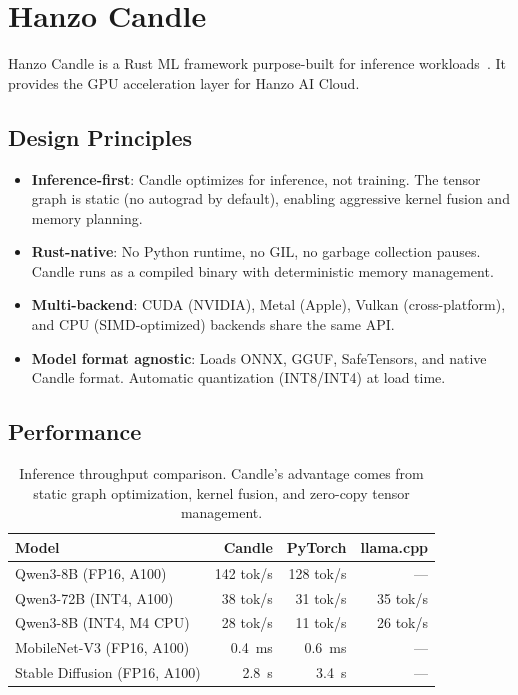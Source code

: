\section{Hanzo Candle}

\label{sec:candle}

Hanzo Candle is a Rust ML framework purpose-built for inference
workloads~\cite{hanzocandle}. It provides the GPU acceleration layer for
Hanzo AI Cloud.

\subsection{Design Principles}

\begin{itemize}[leftmargin=1.1em]
    \item \textbf{Inference-first}: Candle optimizes for inference, not
    training. The tensor graph is static (no autograd by default), enabling
    aggressive kernel fusion and memory planning.
    \item \textbf{Rust-native}: No Python runtime, no GIL, no garbage
    collection pauses. Candle runs as a compiled binary with deterministic
    memory management.
    \item \textbf{Multi-backend}: CUDA (NVIDIA), Metal (Apple), Vulkan
    (cross-platform), and CPU (SIMD-optimized) backends share the same API.
    \item \textbf{Model format agnostic}: Loads ONNX, GGUF, SafeTensors, and
    native Candle format. Automatic quantization (INT8/INT4) at load time.
\end{itemize}

\subsection{Performance}

\begin{table}[H]
\centering
\small
\begin{tabular}{lrrr}
\toprule
\textbf{Model} & \textbf{Candle} & \textbf{PyTorch} & \textbf{llama.cpp} \\
\midrule
Qwen3-8B (FP16, A100) & 142 tok/s & 128 tok/s & --- \\
Qwen3-72B (INT4, A100) & 38 tok/s & 31 tok/s & 35 tok/s \\
Qwen3-8B (INT4, M4 CPU) & 28 tok/s & 11 tok/s & 26 tok/s \\
MobileNet-V3 (FP16, A100) & 0.4~ms & 0.6~ms & --- \\
Stable Diffusion (FP16, A100) & 2.8~s & 3.4~s & --- \\
\bottomrule
\end{tabular}
\caption{Inference throughput comparison. Candle's advantage comes from static
graph optimization, kernel fusion, and zero-copy tensor management.}
\label{tab:candle}
\end{table}

